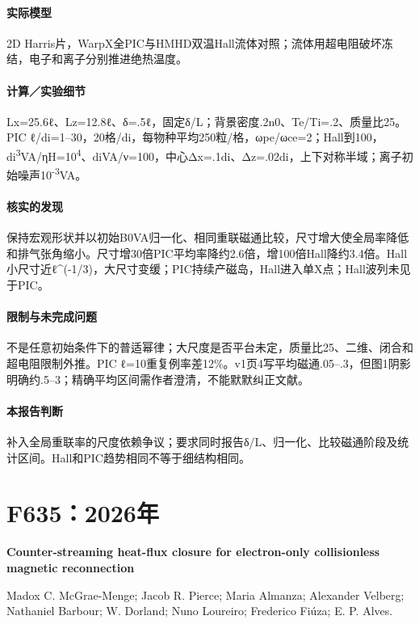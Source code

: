 \documentclass[UTF8,a4paper,11pt,openany,fontset=fandol]{ctexbook}
\begin{document}
\paragraph{实际模型}2D Harris片，WarpX全PIC与HMHD双温Hall流体对照；流体用超电阻破坏冻结，电子和离子分别推进绝热温度。

\paragraph{计算／实验细节}Lx=25.6ℓ、Lz=12.8ℓ、δ=.5ℓ，固定δ/L；背景密度.2n0、Te/Ti=.2、质量比25。PIC ℓ/di=1–30，20格/di，每物种平均250粒/格，ωpe/ωce=2；Hall到100，di\textsuperscript{3}VA/ηH=10\textsuperscript{4}、diVA/ν=100，中心Δx=.1di、Δz=.02di，上下对称半域；离子初始噪声10\textsuperscript{-3}VA。

\paragraph{核实的发现}保持宏观形状并以初始B0VA归一化、相同重联磁通比较，尺寸增大使全局率降低和排气张角缩小。尺寸增30倍PIC平均率降约2.6倍，增100倍Hall降约3.4倍。Hall小尺寸近ℓ\textasciicircum{}(-1/3)，大尺寸变缓；PIC持续产磁岛，Hall进入单X点；Hall波列未见于PIC。

\paragraph{限制与未完成问题}不是任意初始条件下的普适幂律；大尺度是否平台未定，质量比25、二维、闭合和超电阻限制外推。PIC ℓ=10重复例率差12\%。v1页4写平均磁通.05–.3，但图1阴影明确约.5–3；精确平均区间需作者澄清，不能默默纠正文献。

\paragraph{本报告判断}补入全局重联率的尺度依赖争议；要求同时报告δ/L、归一化、比较磁通阶段及统计区间。Hall和PIC趋势相同不等于细结构相同。

\section{F635：2026年}\label{paper:F635}

\textbf{Counter-streaming heat-flux closure for electron-only collisionless magnetic reconnection}\citep{F635}\

Madox C. McGrae-Menge;  Jacob R. Pierce;  Maria Almanza;  Alexander Velberg;  Nathaniel Barbour;  W. Dorland;  Nuno Loureiro;  Frederico Fiúza;  E. P. Alves.
\end{document}
